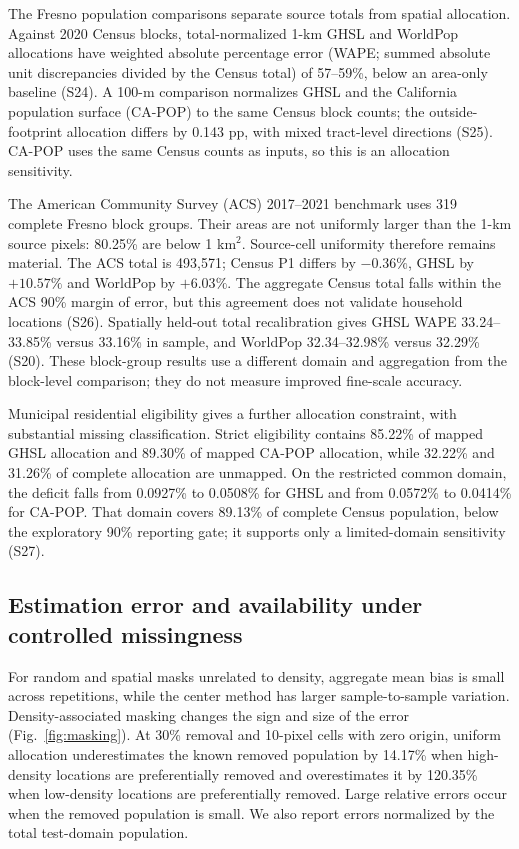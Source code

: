 \documentclass[pdflatex,sn-nature]{sn-jnl}
\begin{document}
The Fresno population comparisons separate source totals from spatial allocation. Against 2020 Census blocks, total-normalized 1-km GHSL and WorldPop allocations have weighted absolute percentage error (WAPE; summed absolute unit discrepancies divided by the Census total) of 57--59\%, below an area-only baseline (S24). A 100-m comparison normalizes GHSL and the California population surface (CA-POP) to the same Census block counts; the outside-footprint allocation differs by 0.143 pp, with mixed tract-level directions (S25). CA-POP uses the same Census counts as inputs, so this is an allocation sensitivity.

The American Community Survey (ACS) 2017--2021 benchmark uses 319 complete Fresno block groups. Their areas are not uniformly larger than the 1-km source pixels: 80.25\% are below 1 km$^2$. Source-cell uniformity therefore remains material. The ACS total is 493,571; Census P1 differs by $-0.36\%$, GHSL by $+10.57\%$ and WorldPop by $+6.03\%$. The aggregate Census total falls within the ACS 90\% margin of error, but this agreement does not validate household locations (S26). Spatially held-out total recalibration gives GHSL WAPE 33.24--33.85\% versus 33.16\% in sample, and WorldPop 32.34--32.98\% versus 32.29\% (S20). These block-group results use a different domain and aggregation from the block-level comparison; they do not measure improved fine-scale accuracy.

Municipal residential eligibility gives a further allocation constraint, with substantial missing classification. Strict eligibility contains 85.22\% of mapped GHSL allocation and 89.30\% of mapped CA-POP allocation, while 32.22\% and 31.26\% of complete allocation are unmapped. On the restricted common domain, the deficit falls from 0.0927\% to 0.0508\% for GHSL and from 0.0572\% to 0.0414\% for CA-POP. That domain covers 89.13\% of complete Census population, below the exploratory 90\% reporting gate; it supports only a limited-domain sensitivity (S27).

\subsection{Estimation error and availability under controlled missingness}
For random and spatial masks unrelated to density, aggregate mean bias is small across repetitions, while the center method has larger sample-to-sample variation. Density-associated masking changes the sign and size of the error (Fig.~\ref{fig:masking}). At 30\% removal and 10-pixel cells with zero origin, uniform allocation underestimates the known removed population by 14.17\% when high-density locations are preferentially removed and overestimates it by 120.35\% when low-density locations are preferentially removed. Large relative errors occur when the removed population is small. We also report errors normalized by the total test-domain population.
\end{document}
